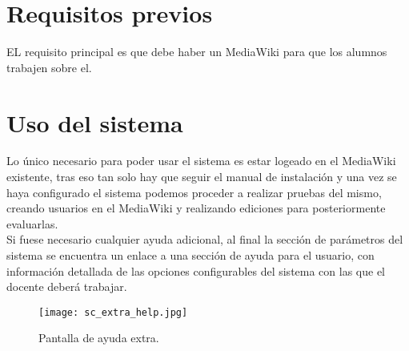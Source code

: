 \section{Requisitos previos}
EL requisito principal es que debe haber un MediaWiki para que los alumnos trabajen sobre el.

\section{Uso del sistema}
Lo único necesario para poder usar el sistema es estar logeado en el MediaWiki existente, tras eso tan solo hay que seguir el manual de instalación y una vez se haya configurado el sistema podemos proceder a realizar pruebas del mismo, creando usuarios en el MediaWiki y realizando ediciones para posteriormente evaluarlas.\\

Si fuese necesario cualquier ayuda adicional, al final la sección de parámetros del sistema se encuentra un enlace a una sección de ayuda para el usuario, con información detallada de las opciones configurables del sistema con las que el docente deberá trabajar.

\begin{figure}[h]
	\centering
	\texttt{[image: sc\_extra\_help.jpg]}
	\caption{Pantalla de ayuda extra.}
\end{figure}





